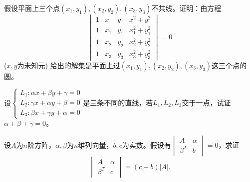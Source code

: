 \begin{ex} \label{ex:2.19}
假设平面上三个点$(x_1, y_1), (x_2, y_2), (x_3, y_3)$不共线。证明：由方程
 $$\begin{vmatrix} 1 & x & y & x^2 + y^2 \\ 1 & x_1 & y_1 & x_1^2 + y_1^2 \\ 1 & x_2 & y_2 & x_2^2 + y_2^2 \\ 1 & x_3 & y_3 & x_3^2 + y_3^2 \end{vmatrix} = 0$$ ($x,y$为未知元) 给出的解集是平面上过$(x_1, y_1), (x_2, y_2), (x_3, y_3)$这三个点的圆。
\end{ex}

\begin{ex} \label{ex:2.20}
设$\left\{ \begin{array}{rcl} L_1: \alpha x + \beta y + \gamma = 0 \\ L_2: \gamma x + \alpha y + \beta = 0 \\ L_3: \beta x + \gamma y + \alpha = 0\end{array}\right.$是三条不同的直线，若$L_1, L_2, L_3$交于一点，试证$\alpha + \beta + \gamma = 0$。
\end{ex}

\begin{ex} \label{ex:2.21}
设$A$为$n$阶方阵，$\alpha,\beta$为$n$维列向量，$b,c$为实数。假设有$\begin{vmatrix} A & \alpha \\ \beta^T & b \end{vmatrix} = 0$，求证$$\begin{vmatrix} A & \alpha \\ \beta^T & c \end{vmatrix} = (c-b)|A|.$$
\end{ex}


